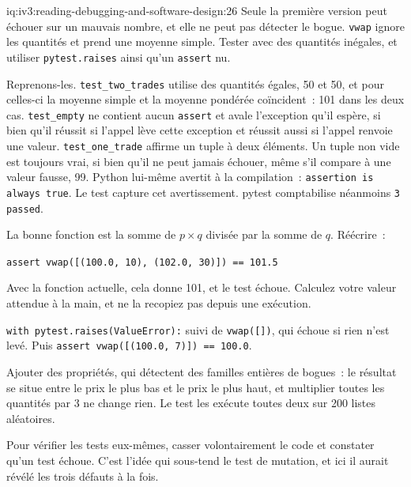 \begin{solution}{iq:iv3:reading-debugging-and-software-design:26}
Seule la première version peut échouer sur un mauvais nombre, et elle ne peut pas détecter le bogue. \texttt{vwap} ignore les quantités et prend une moyenne simple. Tester avec des quantités inégales, et utiliser \texttt{pytest.raises} ainsi qu'un \texttt{assert} nu.

Reprenons-les. \texttt{test\_two\_trades} utilise des quantités égales, 50 et 50, et pour celles-ci la moyenne simple et la moyenne pondérée coïncident~: 101 dans les deux cas. \texttt{test\_empty} ne contient aucun \texttt{assert} et avale l'exception qu'il espère, si bien qu'il réussit si l'appel lève cette exception et réussit aussi si l'appel renvoie une valeur. \texttt{test\_one\_trade} affirme un tuple à deux éléments. Un tuple non vide est toujours vrai, si bien qu'il ne peut jamais échouer, même s'il compare à une valeur fausse, 99. Python lui-même avertit à la compilation~: \texttt{assertion is always true}. Le test capture cet avertissement. pytest comptabilise néanmoins \texttt{3 passed}.

La bonne fonction est la somme de $p \times q$ divisée par la somme de $q$. Réécrire~:

\texttt{assert vwap([(100.0, 10), (102.0, 30)]) == 101.5}

Avec la fonction actuelle, cela donne 101, et le test échoue. Calculez votre valeur attendue à la main, et ne la recopiez pas depuis une exécution.

\texttt{with pytest.raises(ValueError):} suivi de \texttt{vwap([])}, qui échoue si rien n'est levé. Puis \texttt{assert vwap([(100.0, 7)]) == 100.0}.

Ajouter des propriétés, qui détectent des familles entières de bogues~: le résultat se situe entre le prix le plus bas et le prix le plus haut, et multiplier toutes les quantités par 3 ne change rien. Le test les exécute toutes deux sur 200 listes aléatoires.

Pour vérifier les tests eux-mêmes, casser volontairement le code et constater qu'un test échoue. C'est l'idée qui sous-tend le test de mutation, et ici il aurait révélé les trois défauts à la fois.


\end{solution}

